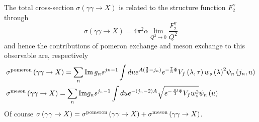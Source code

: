 \documentclass[a4paper,12pt]{article}
\begin{document}
The total cross-section $\sigma\left(\gamma \gamma \rightarrow X\right)$ is related to the structure function $F^\gamma_2$ through
\begin{equation}
\sigma\left(\gamma \gamma \rightarrow X\right) =  4 \pi^2 \alpha \lim_{Q^2 \rightarrow 0} \frac{F_2^\gamma}{Q^2}
\end{equation}
and hence the contributions of pomeron exchange and meson exchange to this observable are, respectively
\begin{align}
&\sigma^{\rm pomeron}\left(\gamma \gamma \rightarrow X\right) =  \sum_n {\rm Im} \, g_n s^{jn-1} \int du e^{A(\frac{3}{2} - j_n)}  e^{-\frac{7}{3} \Phi}  V_f \left( \lambda, \tau \right) {w_s\left(\lambda \right)}^2  \psi_n \left(j_n, u\right) \\ 
&\sigma^{\rm meson}\left(\gamma \gamma \rightarrow X\right) = \sum_n {\rm Im} g_n s^{j_n - 1} \int du e^{-\left(j_n - 2 \right)A }\sqrt{e^{-\frac{10}{3} \Phi} V_f w_s^2}  \psi_n\left(u\right)
\end{align}
Of course $\sigma\left(\gamma \gamma \rightarrow X\right) = \sigma^{\rm pomeron}\left(\gamma \gamma \rightarrow X\right) + \sigma^{\rm meson}\left(\gamma \gamma \rightarrow X\right)$.






\end{document}
